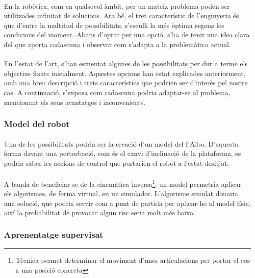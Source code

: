 \documentclass[12pt,a4paper,final,twoside]{article}
\begin{document}
\paragraph{}En la robòtica, com en qualsevol àmbit, per un mateix problema poden ser utilitzades infinitat de solucions. Ara bé, el tret característic de l'enginyeria és que d'entre la multitud de possibilitats, s'esculli la més òptima segons les condicions del moment. Abans d'optar per una opció, s'ha de tenir una idea clara del que aporta cadascuna i observar com s'adapta a la problemàtica actual.

\paragraph{}En l'estat de l'art, s'han esmentat algunes de les possibilitats per dur a terme els objectius fixats inicialment. Aquestes opcions han estat explicades anteriorment, amb una breu descripció i trets característics que podrien ser d'interès pel nostre cas. A continuació, s'exposa com cadascuna podria adaptar-se al problema, mencionant els seus avantatges i inconvenients.

\subsubsection{Model del robot}
\paragraph{}Una de les possibilitats podria ser la creació d'un model del l'Aibo. D'aquesta forma davant una pertorbació, com és el canvi d'inclinació de la plataforma, es podria saber les accions de control que portarien el robot a l'estat desitjat.

\paragraph{}A banda de beneficiar-se de la cinemàtica inversa\footnote{Tècnica permet determinar el moviment d'unes articulacions per portar el cos a una posició concreta}, un model permetria aplicar els algorismes, de forma virtual, en un simulador. L'algorisme simulat donaria una solució, que podria servir com a punt de partida per aplicar-ho al model físic, així la probabilitat de provocar algun risc seria molt més baixa.

\subsubsection{Aprenentatge supervisat}
\end{document}
